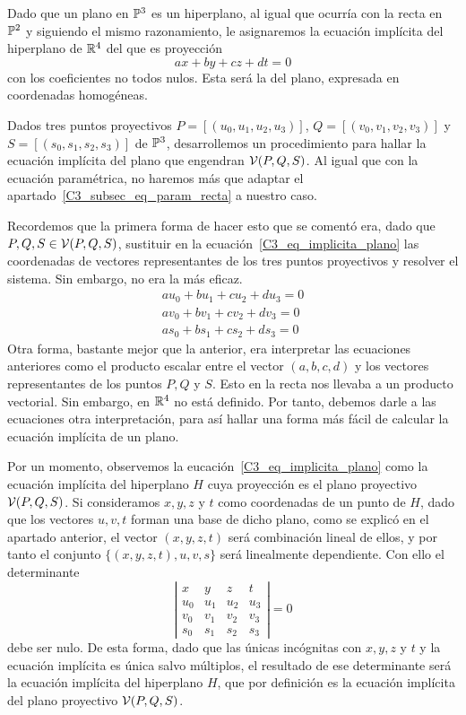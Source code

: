 Dado que un plano en $\mathbb{P}^3$ es un hiperplano, al igual que ocurría con la recta en $\mathbb{P}^2$ y siguiendo el mismo razonamiento, le asignaremos la ecuación implícita del hiperplano de $\mathbb{R}^4$ del que es proyección
\begin{equation}
\label{C3_eq_implicita_plano}
ax+by+cz+dt=0
\end{equation}
con los coeficientes no todos nulos. Esta será la  del plano, expresada en coordenadas homogéneas. 

Dados tres puntos proyectivos $P=[(u_0,u_1,u_2,u_3)]$, $Q=[(v_0,v_1,v_2,v_3)]$ y $S=[(s_0,s_1,s_2,s_3)]$ de $\mathbb{P}^3$, desarrollemos un procedimiento para hallar la ecuación implícita del plano que engendran $\mathcal{V}(P,Q,S)$. Al igual que con la ecuación paramétrica, no haremos más que adaptar el apartado~\ref{C3_subsec_eq_param_recta} a nuestro caso.

Recordemos que la primera forma de hacer esto que se comentó era, dado que $P,Q,S\in \mathcal{V}(P,Q,S)$, sustituir en la ecuación~\eqref{C3_eq_implicita_plano} las coordenadas de vectores representantes de los tres puntos proyectivos y resolver el sistema. Sin embargo, no era la más eficaz.
\begin{equation}
	\begin{split}
		au_0+bu_1+cu_2+du_3=0\\
		av_0+bv_1+cv_2+dv_3=0\\
		as_0+bs_1+cs_2+ds_3=0
	\end{split}
\end{equation}
Otra forma, bastante mejor que la anterior, era interpretar las ecuaciones anteriores como el producto escalar entre el vector $(a,b,c,d)$ y los vectores representantes de los puntos $P,Q$ y $S$. Esto en la recta nos llevaba a un producto vectorial. Sin embargo, en $\mathbb{R}^4$ no está definido. Por tanto, debemos darle a las ecuaciones otra interpretación, para así hallar una forma más fácil de calcular la ecuación implícita de un plano. 

Por un momento, observemos la eucación~\eqref{C3_eq_implicita_plano} como la ecuación implícita del hiperplano $H$ cuya proyección es el plano proyectivo $\mathcal{V}(P,Q,S)$. Si consideramos $x,y,z$ y $t$ como coordenadas de un punto de $H$, dado que los vectores $u,v,t$ forman una base de dicho plano, como se explicó en el apartado anterior, el vector $(x,y,z,t)$ será combinación lineal de ellos, y por tanto el conjunto $\{(x,y,z,t),u,v,s\}$ será linealmente dependiente. Con ello el determinante
\begin{equation}
	\left| \begin{array}{cccc}
	x & y & z& t\\
	u_0 & u_1 & u_2 & u_3\\
	v_0 & v_1 & v_2 & v_3\\
	s_0 & s_1 & s_2 & s_3
	\end{array}\right| =0
\end{equation}
debe ser nulo. De esta forma, dado que las únicas incógnitas con $x,y,z$ y $t$ y la ecuación implícita es única salvo múltiplos, el resultado de ese determinante será la ecuación implícita del hiperplano $H$, que por definición es la ecuación implícita del plano proyectivo $\mathcal{V}(P,Q,S)$.

